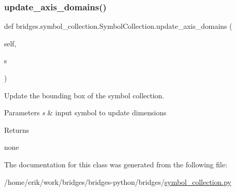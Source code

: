 \subsubsection{\texorpdfstring{update\+\_\+axis\+\_\+domains()}{update\_axis\_domains()}}
{\footnotesize\ttfamily def bridges.\+symbol\+\_\+collection.\+Symbol\+Collection.\+update\+\_\+axis\+\_\+domains (\begin{DoxyParamCaption}\item[{}]{self,  }\item[{}]{s }\end{DoxyParamCaption})}



Update the bounding box of the symbol collection. 


\begin{DoxyParams}{Parameters}
{\em s} & input symbol to update dimensions \\
\hline
\end{DoxyParams}
\begin{DoxyReturn}{Returns}


none 
\end{DoxyReturn}


The documentation for this class was generated from the following file\+:\begin{DoxyCompactItemize}
\item 
/home/erik/work/bridges/bridges-\/python/bridges/\hyperlink{symbol__collection_8py}{symbol\+\_\+collection.\+py}\end{DoxyCompactItemize}
